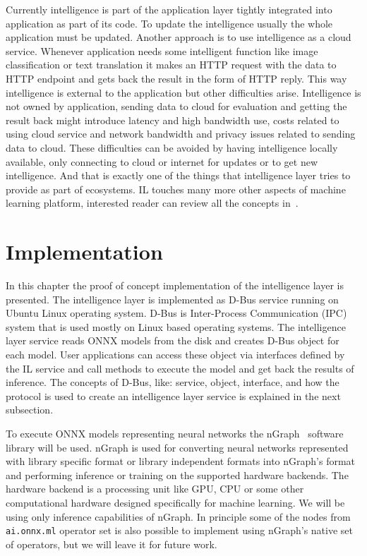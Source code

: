 \documentclass[english, 12pt, a4paper, elec, utf8, online]{aaltothesis}
\begin{document}
Currently intelligence is part of the application layer tightly integrated into application as part of its code. To update the intelligence usually the whole application must be updated. Another approach is to use intelligence as a cloud service. Whenever application needs some intelligent function like image classification or text translation it makes an HTTP request with the data to HTTP endpoint and gets back the result in the form of HTTP reply. This way intelligence is external to the application but other difficulties arise. Intelligence is not owned by application, sending data to cloud for evaluation and getting the result back might introduce latency and high bandwidth use, costs related to using cloud service and network bandwidth and privacy issues related to sending data to cloud. These difficulties can be avoided by having intelligence locally available, only connecting to cloud or internet for updates or to get new intelligence. And that is exactly one of the things that intelligence layer tries to provide as part of ecosystems. IL touches many more other aspects of machine learning platform, interested reader can review all the concepts in~\cite{edgar2019}.               


\clearpage

\section{Implementation}\label{chapter:implementation}\label{chapter:implementation}
In this chapter the proof of concept implementation of the intelligence layer is presented. The intelligence layer is implemented as D-Bus service running on Ubuntu Linux operating system. D-Bus is Inter-Process Communication (IPC) system that is used mostly on Linux based operating systems. The intelligence layer service reads ONNX models from the disk and creates D-Bus object for each model. User applications can access these object via interfaces defined by the IL service and call methods to execute the model and get back the results of inference. The concepts of D-Bus, like: service, object, interface, and how the protocol is used to create an intelligence layer service is explained in the next subsection. 

To execute ONNX models representing neural networks the nGraph~\cite{cyphers2018intel}  software library will be used. nGraph is used for converting neural networks represented with library specific format or library independent formats into nGraph's format and performing inference or training on the supported hardware backends. The hardware backend is a processing unit like GPU, CPU or some other computational hardware designed specifically for machine learning. We will be using only inference capabilities of nGraph. In principle some of the nodes from \texttt{ai.onnx.ml} operator set is also possible to implement using nGraph’s native set of operators, but we will leave it for future work.
\end{document}
